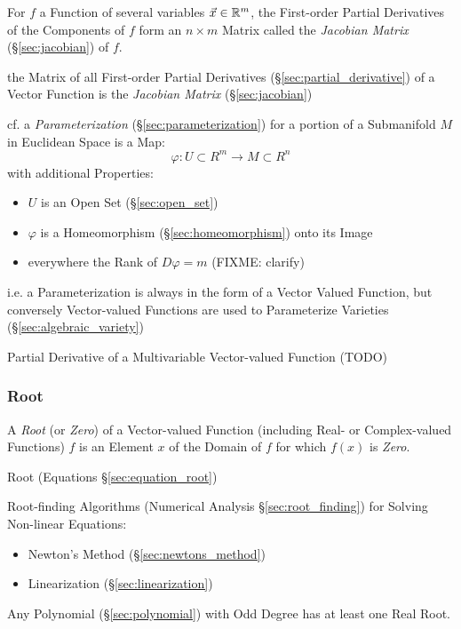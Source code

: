 For $f$ a Function of several variables $\vec{x} \in \mathbb{R}^m$, the First-order
Partial Derivatives of the Components of $f$ form an $n \times m$ Matrix called
the \emph{Jacobian Matrix} (\S\ref{sec:jacobian}) of $f$.

the Matrix of all First-order Partial Derivatives
(\S\ref{sec:partial_derivative}) of a Vector Function is the \emph{Jacobian
  Matrix} (\S\ref{sec:jacobian})

\fist cf. a \emph{Parameterization} (\S\ref{sec:parameterization}) for a
portion of a Submanifold $M$ in Euclidean Space is a Map:
\[
  \varphi : U \subset R^m \rightarrow M \subset R^n
\]
with additional Properties:
\begin{itemize}
  \item $U$ is an Open Set (\S\ref{sec:open_set})
  \item $\varphi$ is a Homeomorphism (\S\ref{sec:homeomorphism}) onto its Image
  \item everywhere the Rank of $D\varphi = m$ (FIXME: clarify)
\end{itemize}
i.e. a Parameterization is always in the form of a Vector Valued Function, but
conversely Vector-valued Functions are used to Parameterize Varieties
(\S\ref{sec:algebraic_variety}) %

Partial Derivative of a Multivariable Vector-valued Function (TODO)



\subsubsection{Root}\label{sec:function_root}

A \emph{Root} (or \emph{Zero}) of a Vector-valued Function (including Real- or
Complex-valued Functions) $f$ is an Element $x$ of the Domain of $f$ for which
$f(x)$ is \emph{Zero}.

\fist Root (Equations \S\ref{sec:equation_root})

\fist Root-finding Algorithms (Numerical Analysis \S\ref{sec:root_finding}) for
Solving Non-linear Equations:
\begin{itemize}
  \item Newton's Method (\S\ref{sec:newtons_method})
  \item Linearization (\S\ref{sec:linearization})
\end{itemize}

Any Polynomial (\S\ref{sec:polynomial}) with Odd Degree has at least
one Real Root.

